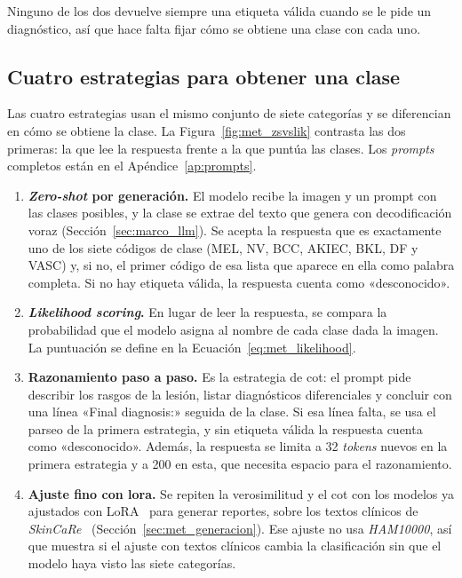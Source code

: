 Ninguno de los dos devuelve siempre una etiqueta válida cuando se le pide un diagnóstico, así que hace falta fijar
cómo se obtiene una clase con cada uno.

\subsection{Cuatro estrategias para obtener una clase}
\label{sec:met_vlm_estrategias}

Las cuatro estrategias usan el mismo conjunto de siete categorías y se diferencian en cómo se obtiene la clase. La
Figura~\ref{fig:met_zsvslik} contrasta las dos primeras: la que lee la respuesta frente a la que puntúa las
clases. Los \emph{prompts} completos están en el Apéndice~\ref{ap:prompts}.

\begin{enumerate}[leftmargin=1.6em]
  \item \textbf{\emph{Zero-shot} por generación.} El modelo recibe la imagen y un prompt con las clases posibles, y la
  clase se extrae del texto que genera con decodificación voraz (Sección~\ref{sec:marco_llm}). Se acepta la respuesta
  que es exactamente uno de los siete códigos de clase (MEL, NV, BCC, AKIEC, BKL, DF y VASC) y, si no, el primer código
  de esa lista que aparece en ella como palabra completa. Si no hay etiqueta válida, la respuesta cuenta
  como «desconocido».
  \item \textbf{\emph{Likelihood scoring}.} En lugar de leer la respuesta, se compara la probabilidad que el modelo asigna al
  nombre de cada clase dada la imagen. La puntuación se define en la Ecuación~\ref{eq:met_likelihood}.
  \item \textbf{Razonamiento paso a paso.} Es la estrategia de \gls{cot}: el prompt pide describir los rasgos de la
  lesión, listar diagnósticos diferenciales y concluir con una línea «Final diagnosis:» seguida de la clase. Si esa línea
  falta, se usa el parseo de la primera estrategia, y sin etiqueta válida la respuesta cuenta como «desconocido».
  Además, la respuesta se limita a 32 \emph{tokens} nuevos en la primera estrategia y a 200 en esta, que necesita espacio para el
  razonamiento.
  \item \textbf{Ajuste fino con \gls{lora}.} Se repiten la verosimilitud y el \gls{cot} con los modelos ya ajustados
  con LoRA~\cite{hu2021lora} para generar reportes, sobre los textos clínicos de \emph{SkinCaRe}~\cite{shen2025skincare}
  (Sección~\ref{sec:met_generacion}). Ese ajuste no usa \emph{HAM10000}, así que muestra si el ajuste con textos
  clínicos cambia la clasificación sin que el modelo haya visto las siete categorías.
\end{enumerate}

